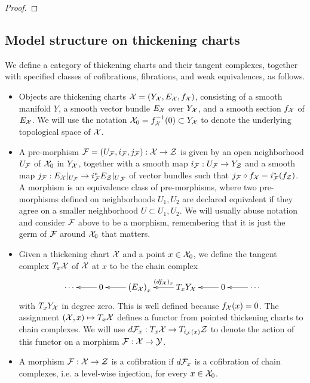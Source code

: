 \begin{proof}
\jake{[To be done.]}
\end{proof}

\subsection{Model structure on thickening charts}

\begin{definition}\label{thickening-model-structure}
We define a category of thickening charts and their tangent complexes, together with specified classes of cofibrations, fibrations, and weak equivalences, as follows.
\begin{itemize}

\item Objects are thickening charts $\mathcal X = (Y_\mathcal X, E_\mathcal X, f_\mathcal X)$, consisting of a smooth manifold $Y$, a smooth vector bundle $E_\mathcal X$ over $Y_\mathcal X$, and a smooth section $f_\mathcal X$ of $E_\mathcal X$. We will use the notation $\mathcal X_0 = f_\mathcal X^{-1}(0) \subset Y_\mathcal X$ to denote the underlying topological space of $\mathcal X$.

\item A pre-morphism $\mathcal F = (U_\mathcal F, i_\mathcal F, j_\mathcal F): \mathcal X \to \mathcal Z$ is given by an open neighborhood $U_\mathcal F$ of $\mathcal X_0$ in $Y_\mathcal X$, together with a smooth map $i_\mathcal F: U_\mathcal F \to Y_\mathcal Z$ and a smooth map $j_\mathcal F: {E_\mathcal X|_{U_\mathcal F}} \to {i_\mathcal F^* E_\mathcal Z|_{U}}_{\mathcal F}$ of vector bundles such that $j_\mathcal F \circ f_\mathcal X = i_\mathcal F^*(f_\mathcal Z)$. A morphism is an equivalence class of pre-morphisms, where two pre-morphisms defined on neighborhoods $U_1, U_2$ are declared equivalent if they agree on a smaller neighborhood $U \subset U_1, U_2$. We will usually abuse notation and consider $\mathcal F$ above to be a morphism, remembering that it is just the germ of $\mathcal F$ around $\mathcal X_0$ that matters.

\item Given a thickening chart $\mathcal X$ and a point $x \in \mathcal X_0$, we define the tangent complex $T_x \mathcal X$ of $\mathcal X$ at $x$ to be the chain complex
\[\xymatrix{ \cdots & 0 \ar[l] & \left(E_\cX\right)_x \ar[l] & T_x Y_\cX \ar[l]_-{(df_\cX)_x} & 0 \ar[l] & \cdots \ar[l] }\]
with $T_x Y_\mathcal X$ in degree zero. This is well defined because $f_\mathcal X(x) = 0$. The assignment $(\mathcal X, x) \mapsto T_x \mathcal X$ defines a functor from pointed thickening charts to chain complexes. We will use $d \mathcal F_x: T_x \mathcal X \to T_{i_\mathcal F(x)} \mathcal Z$ to denote the action of this functor on a morphism $\mathcal F: \mathcal X \to \mathcal Y$.

\item A morphism $\mathcal F : \mathcal X \to \mathcal Z$ is a cofibration if $d \mathcal F_x$ is a cofibration of chain complexes, i.e. a level-wise injection, for every $x \in \mathcal X_0$.


\end{itemize}
\end{definition}
